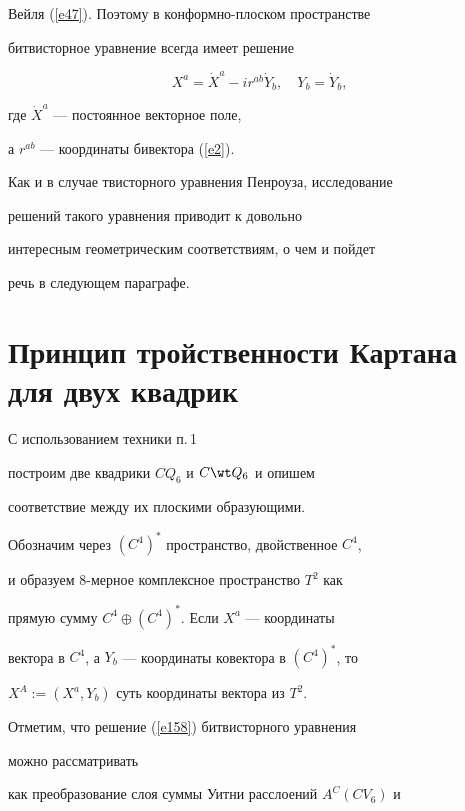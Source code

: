 Вейля (\ref{e47}). Поэтому в конформно-плоском пространстве


битвисторное уравнение всегда имеет решение


\begin{equation}


\label{e158} %


X^a = \Dot X^a -ir^{ab}\Dot Y_b,\quad


Y_b = \Dot Y_b,


\end{equation}


где $\Dot X^a$ --- постоянное векторное поле,


а $r^{ab}$ --- координаты бивектора (\ref{e2}).


Как и в случае твисторного уравнения Пенроуза, исследование


решений такого уравнения приводит к довольно


интересным геометрическим соответствиям, о чем и пойдет


речь в следующем параграфе.





\section{Принцип тройственности Картана для двух квадрик}





С использованием техники п.\,1


построим две квадрики $CQ_6$ и $C\wt Q_6$ и опишем


соответствие между их плоскими образующими.





Обозначим через $(C^4)^*$ пространство, двойственное $C^4$,


и образуем 8-мерное комплексное пространство $T^2$ как


прямую сумму $C^4\oplus (C^4)^*$. Если $X^a$ --- координаты


вектора в $C^4$, а $Y_b$ --- координаты ковектора в $(C^4)^*$, то


$X^A:=(X^a,Y_b)$ суть координаты вектора из $T^2$.


Отметим, что решение (\ref{e158}) битвисторного уравнения


можно рассматривать


как преобразование слоя суммы Уитни расслоений $A^C(CV_6)$ и


